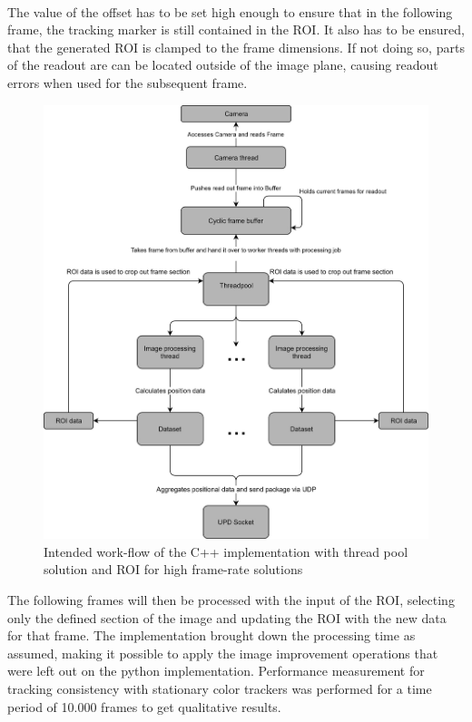 \\The value of the offset has to be set high enough to ensure that in the following frame, the tracking marker is still contained in the ROI. It also has to be ensured, that the generated ROI is clamped to the frame dimensions. If not doing so, parts of the readout are can be located outside of the image plane, causing readout errors when used for the subsequent frame.
\begin{figure}[H]
\centering
\includegraphics[width=\textwidth]{images/pi_workflow_500.jpg}
\caption{Intended work-flow of the C++ implementation with thread pool solution and ROI for high frame-rate solutions}
\label{c++ work flow map} 
\end{figure} The following frames will then be processed with the input of the ROI, selecting only the defined section of the image and updating the ROI with the new data for that frame. The implementation brought down the processing time as assumed, making it possible to apply the image improvement operations that were left out on the python implementation.
Performance measurement for tracking consistency with stationary color trackers was performed for a time period of 10.000 frames to get qualitative results. 
